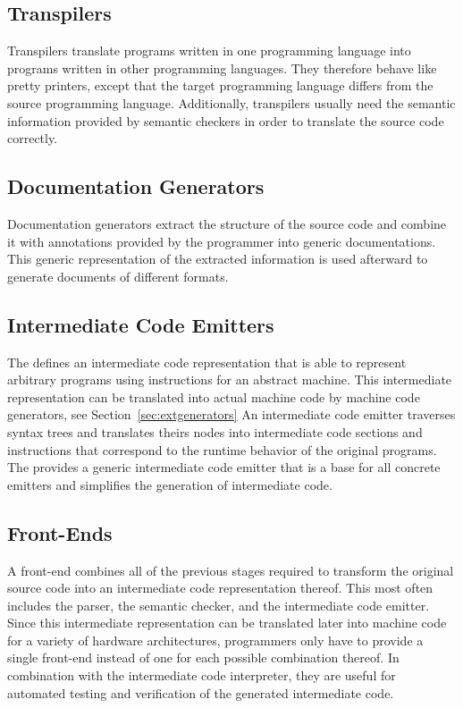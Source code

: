 \subsection{Transpilers}

Transpilers translate programs written in one programming language into programs written in other programming languages.
They therefore behave like pretty printers, except that the target programming language differs from the source programming language.
Additionally, transpilers usually need the semantic information provided by semantic checkers in order to translate the source code correctly.

\subsection{Documentation Generators}

Documentation generators extract the structure of the source code and combine it with annotations provided by the programmer into generic documentations.
This generic representation of the extracted information is used afterward to generate documents of different formats.
\seedocumentation

\subsection{Intermediate Code Emitters}

The \ecs{} defines an intermediate code representation that is able to represent arbitrary programs using instructions for an abstract machine.
This intermediate representation can be translated into actual machine code by machine code generators, see Section~\ref{sec:extgenerators}
An intermediate code emitter traverses syntax trees and translates theirs nodes into intermediate code sections and instructions that correspond to the runtime behavior of the original programs.
The \ecs{} provides a generic intermediate code emitter that is a base for all concrete emitters and simplifies the generation of intermediate code.
\seecode

\subsection{Front-Ends}\label{sec:extfrontends}

A front-end combines all of the previous stages required to transform the original source code into an intermediate code representation thereof.
This most often includes the parser, the semantic checker, and the intermediate code emitter.
Since this intermediate representation can be translated later into machine code for a variety of hardware architectures,
programmers only have to provide a single front-end instead of one for each possible combination thereof.
In combination with the intermediate code interpreter, they are useful for automated testing and verification of the generated intermediate code.

